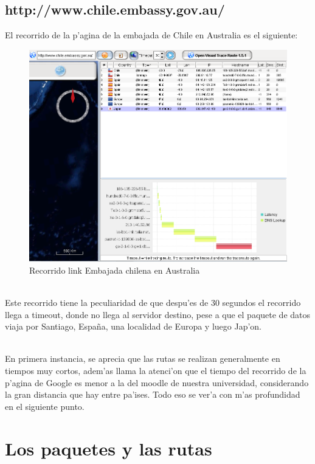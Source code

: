 \documentclass{article}
\begin{document}
\subsection{http://www.chile.embassy.gov.au/}
El recorrido de la p'agina de la embajada de Chile en Australia es el siguiente:
\\
\begin{figure}[H]
  \centering
    \includegraphics[width=1.0\textwidth]{ruta1_embchile}
  \caption{Recorrido link Embajada chilena en Australia}
  \label{embchile}
\end{figure}\\

Este recorrido tiene la peculiaridad de que despu'es de 30 segundos el recorrido llega a timeout, donde no llega al servidor destino, pese a que el paquete de datos viaja por Santiago, España, una localidad de Europa y luego Jap'on.\\ \

En primera instancia, se aprecia que las rutas se realizan generalmente en tiempos muy cortos, adem'as llama la atenci'on que el tiempo del recorrido de la p'agina de Google es menor a la del moodle de nuestra universidad, considerando la gran distancia que hay entre pa'ises. Todo eso se ver'a con m'as profundidad en el siguiente punto.

\section{Los paquetes y las rutas}
\end{document}
